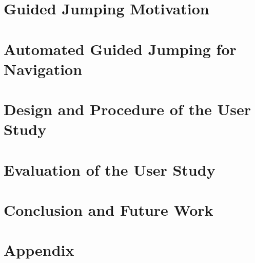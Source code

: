 
\chapter{Guided Jumping Motivation}



\chapter{Automated Guided Jumping for Navigation}



%


\chapter{Design and Procedure of the User Study}



%


\chapter{Evaluation of the User Study}



\chapter{Conclusion and Future Work}



{\footnotesize
{}

}


\appendix
\chapter{Appendix}




